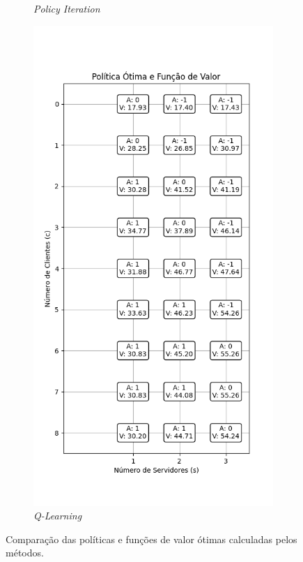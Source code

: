 \begin{figure}[H]
\begin{subfigure}{0.3\textwidth}
        \caption{\textit{Policy Iteration}}
    \end{subfigure}
    \begin{subfigure}{0.3\textwidth}
        \centering
        \includegraphics[width=\linewidth]{fig/q_learning_policy_and_values.png}
        \caption{\textit{Q-Learning}}
    \end{subfigure}
    \caption{Comparação das políticas e funções de valor ótimas calculadas pelos métodos.}
    \label{fig:comparison}
\end{figure}

